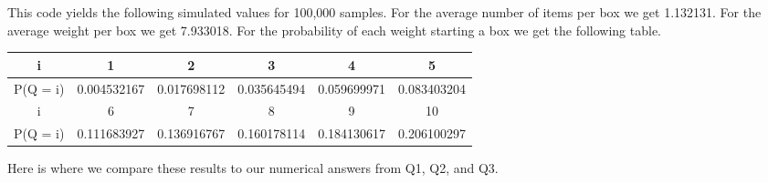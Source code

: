 \documentclass[10pt,a4paper]{article}
\begin{document}
This code yields the following simulated values for 100,000 samples. For the average number of items per box we get 1.132131. For the average weight per box we get 7.933018. For the probability of each weight starting a box we get the following table.
\begin{center}
\begin{tabu}{ |c|c|c|c|c|c| }
    \hline
    i & 1 & 2 & 3 & 4 & 5 \\
    \hline
    P(Q = i) & 0.004532167 & 0.017698112 & 0.035645494 & 0.059699971 & 0.083403204   \\
    \hline
    i & 6 & 7 & 8 & 9 & 10\\
    \hline
    P(Q = i) & 0.111683927 & 0.136916767 & 0.160178114 & 0.184130617 & 0.206100297 \\
    \hline
\end{tabu}
\end{center}
 
Here is where we compare these results to our numerical answers from Q1, Q2, and Q3.
%
%
\end{document}
